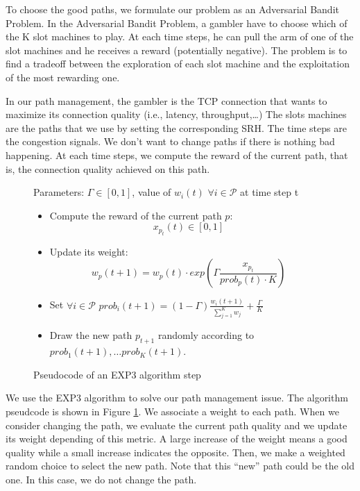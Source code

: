 To choose the good paths, we formulate our problem as an Adversarial Bandit Problem.
In the Adversarial Bandit Problem, a gambler have to choose which of the K slot machines
to play. At each time steps, he can pull the arm of one of the slot machines and he receives a reward
(potentially negative).
The problem is to find a tradeoff between the exploration of each slot machine and the exploitation
of the most rewarding one.

In our path management, the gambler is the TCP connection that wants to maximize its connection quality
(i.e., latency, throughput,\dots)
The slots machines are the paths that we use by setting the corresponding SRH.
The time steps are the congestion signals. We don't want to change paths if there is nothing bad happening.
At each time steps, we compute the reward of the current path,
that is, the connection quality achieved on this path.

\begin{figure}
	\begin{framed}
		Parameters: $\Gamma \in [0, 1]$, value of $w_i(t)$ $\forall i \in \mathcal{P}$ at time step t
		\begin{itemize}
			\setlength{\itemsep}{0pt}
			\setlength{\parskip}{0pt}
			\item Compute the reward of the current path $p$: $$x_{p_t}(t) \in [0, 1]$$
			\item Update its weight: $$w_p(t+1) = w_p(t) \cdot exp(\Gamma \frac{x_{p_t}}{prob_p(t) \cdot K})$$
			\item Set $\forall i \in \mathcal{P}$ $prob_i(t+1) = (1 - \Gamma) \frac{w_i(t+1)}{\sum^K_{j=1}w_j} + \frac{\Gamma}{K}$
			\item Draw the new path $p_{t+1}$ randomly according to ${prob_1(t+1)},\dots {prob_K(t+1)}$.
		\end{itemize}
	\end{framed}
	\caption{Pseudocode of an EXP3 algorithm step}
	\label{algo:exp3}
\end{figure}

We use the EXP3 algorithm to solve our path management issue.
The algorithm pseudcode is shown in Figure \ref{algo:exp3}.
We associate a weight to each path. When we consider changing the path, we evaluate the current path quality
and we update its weight depending of this metric. A large increase of the weight means a good quality while
a small increase indicates the opposite.
Then, we make a weighted random choice to select the new path.
Note that this ``new'' path could be the old one. In this case, we do not change the path.

